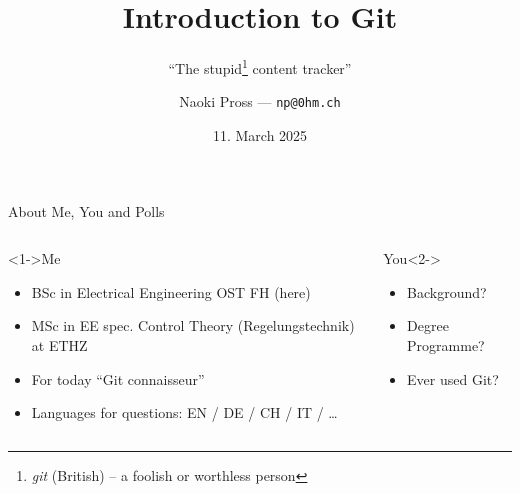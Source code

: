 \documentclass[xetex]{beamer}
\title{
  Introduction to Git
}
\subtitle{
  ``The stupid\footnote{
    \emph{git} (British) -- a foolish or worthless person}
  content tracker''
}
\author{
  Naoki Pross --- \texttt{np@0hm.ch}
}
\institute{}
\date{11. March 2025}
\begin{document}
\frame{\titlepage}

\begin{frame}[fragile]{About Me, You and Polls}
  \begin{columns}[t]
    \begin{column}{.5\linewidth}
      \begin{block}<1->{Me}
        \begin{itemize}
          \item BSc in Electrical Engineering OST FH (here)
          \item MSc in EE spec. Control Theory (Regelungstechnik) at ETHZ
          \item For today ``Git connaisseur''
          \item Languages for questions: EN / DE / CH / IT / \ldots
        \end{itemize}
      \end{block}
    \end{column}
    \begin{column}{.5\linewidth}
      \begin{exampleblock}{You}<2->
        \begin{itemize}
          \item Background?
          \item Degree Programme?
          \item Ever used Git?
        \end{itemize}
      \end{exampleblock}
    \end{column}
  \end{columns}
\end{frame}
\end{document}
